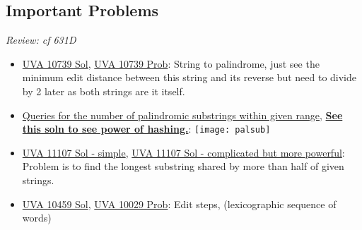 \documentclass[8pt, a4paper, oneside, twocolumn]{extarticle}
\begin{document}
\subsection{Important Problems}
\textit{Review: cf 631D}
\begin{itemize}
	\item \href {https://github.com/sourabh2311/Competitive-Programming/blob/master/UVA_10739.cpp}{UVA 10739 Sol}, \href {https://uva.onlinejudge.org/external/107/10739.pdf}{UVA 10739 Prob}: String to palindrome, just see the minimum edit distance between this string and its reverse but need to divide by 2 later as both strings are it itself.	
	\item \href {https://codeforces.com/contest/245/problem/H}{Queries for the number of palindromic substrings within given range}, \href {https://github.com/sourabh2311/Competitive-Programming/blob/master/IMP%20QUES/Suffix%20String%20Structure/Hash/514C%20-%20Watto%20And%20Mechanism.cpp}{\textbf {See this soln to see power of hashing.}}: \texttt{[image: palsub]} 	
	\item \href {https://github.com/sourabh2311/Competitive-Programming/blob/master/HimanshuSA11107.cpp}{UVA 11107 Sol - simple}, \href {https://github.com/sourabh2311/Competitive-Programming/blob/master/HimanshuSA11107.cpp}{UVA 11107 Sol - complicated but more powerful}: Problem is to find the longest substring shared by more than half of given strings.	
	\item \href {https://gist.github.com/sourabh2311/25edb7a7067948832ade9192bd2635ce}{UVA 10459 Sol}, \href {https://uva.onlinejudge.org/external/104/10459.pdf}{UVA 10029 Prob}: Edit steps, (lexicographic sequence of words)	
\end{itemize}
\end{document}
